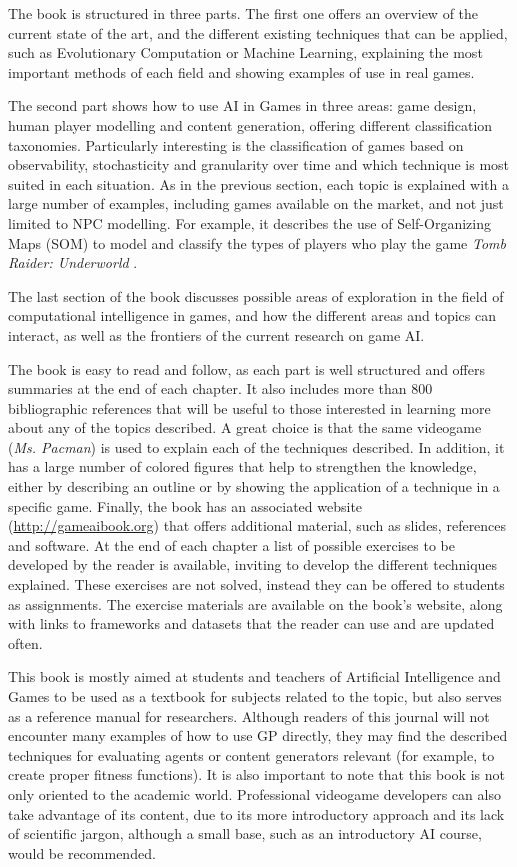 \documentclass{article}
\begin{document}
The book is structured in three parts. The first one offers an overview of the current state of the art, and the different existing techniques that can be applied, such as Evolutionary Computation or Machine Learning, explaining the most important methods of each field and showing examples of use in real games. 

The second part shows how to use AI in Games in three areas: game design, human player modelling and content generation, offering different classification taxonomies. Particularly interesting is the classification of games based on observability, stochasticity and granularity over time and which technique is most suited in each situation. As in the previous section, each topic is explained with a large number of examples, including games available on the market, and not just limited to NPC modelling. For example, it describes the use of Self-Organizing Maps (SOM) to model and classify the types of players who play the game {\em Tomb Raider: Underworld} \cite{MahlmannDTCY10}.

The last section of the book discusses possible areas of exploration in the field of computational intelligence in games, and how the different areas and topics can interact, as well as the frontiers of the current research on game AI.

The book is easy to read and follow, as each part is well structured and offers summaries at the end of each chapter. It also includes more than 800 bibliographic references that will be useful to those interested in learning more about any of the topics described. A great choice is that the same videogame ({\em Ms. Pacman}) is used to explain each of the techniques described. In addition, it has a large number of colored figures that help to strengthen the knowledge, either by describing an outline or by showing the application of a technique in a specific game. Finally, the book has an associated website (\url{http://gameaibook.org}) that offers additional material, such as slides, references and software. At the end of each chapter a list of possible exercises to be developed by the reader is available, inviting to develop the different techniques explained. These exercises are not solved, instead they can be offered to students as assignments. The exercise materials are available on the book's website, along with links to frameworks and datasets that the reader can use and are updated often. 

This book is mostly aimed at students and teachers of Artificial Intelligence and Games to be used as a textbook for subjects related to the topic, but also serves as a reference manual for researchers.  Although readers of this journal will not encounter many examples of how to use GP directly, they may find the described techniques for evaluating agents or content generators relevant (for example, to create proper fitness functions). It is also important to note that this book is not only oriented to the academic world. Professional videogame developers can also take advantage of its content, due to its more introductory approach and its lack of scientific jargon, although a small base, such as an introductory AI course, would be recommended.



\end{document}
